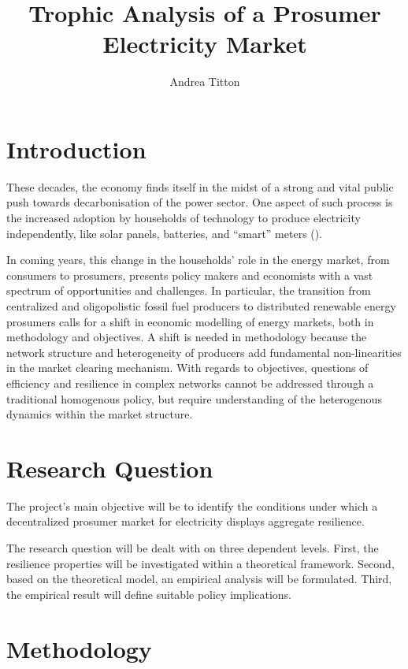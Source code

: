 \documentclass[american]{scrartcl}
\title{
        Trophic Analysis of a Prosumer Electricity Market
    }
\author{Andrea Titton}
\begin{document}
\maketitle

\section{Introduction}

These decades, the economy finds itself in the midst of a strong and vital public push towards decarbonisation of the power sector. One aspect of such process is the increased adoption by households of technology to produce electricity independently, like solar panels, batteries, and ``smart'' meters (\cite{Parag2016}).

In coming years, this change in the households' role in the energy market, from consumers to prosumers, presents policy makers and economists with a vast spectrum of opportunities and challenges. In particular, the transition from centralized and oligopolistic fossil fuel producers to distributed renewable energy prosumers calls for a shift in economic modelling of energy markets, both in methodology and objectives. A shift is needed in methodology because the network structure and heterogeneity of producers add fundamental non-linearities in the market clearing mechanism. With regards to objectives, questions of efficiency and resilience in complex networks cannot be addressed through a traditional homogenous policy, but require understanding of the heterogenous dynamics within the market structure.

\section{Research Question}

The project's main objective will be to identify the conditions under which a decentralized prosumer market for electricity displays aggregate resilience.

The research question will be dealt with on three dependent levels. First, the resilience properties will be investigated within a theoretical framework. Second, based on the theoretical model, an empirical analysis will be formulated. Third, the empirical result will define suitable policy implications.

\section{Methodology}
\end{document}
